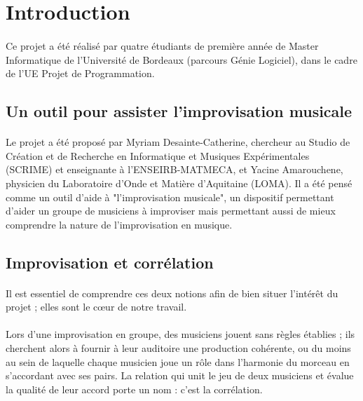 
\section{Introduction}
\paragraph{}
Ce projet a été réalisé par quatre étudiants de première année de
Master Informatique de l'Université de Bordeaux (parcours Génie
Logiciel), dans le cadre de l'UE Projet de Programmation.

\subsection{Un outil pour assister l'improvisation musicale}
\paragraph{}
Le projet a été proposé par Myriam Desainte-Catherine, chercheur au
Studio de Création et de Recherche en Informatique et Musiques
Expérimentales (SCRIME) et enseignante à l'ENSEIRB-MATMECA, et Yacine
Amarouchene, physicien du Laboratoire d'Onde et Matière d'Aquitaine
(LOMA). Il a été pensé comme un outil d'aide à "l'improvisation
musicale", un dispositif permettant d'aider un groupe de musiciens à
improviser mais permettant aussi de mieux comprendre la nature de
l'improvisation en musique.

\subsection{Improvisation et corrélation}
\paragraph{}

Il est essentiel de comprendre ces deux notions afin de bien situer
l'intérêt du projet ; elles sont le c\oe ur de notre travail.

\paragraph{}
Lors d'une improvisation en groupe, des musiciens jouent sans règles
établies ; ils cherchent alors à fournir à leur auditoire une
production cohérente, ou du moins au sein de laquelle chaque musicien
joue un rôle dans l'harmonie du morceau en s'accordant avec ses
pairs. La relation qui unit le jeu de deux musiciens et évalue la
qualité de leur accord porte un nom : c'est la corrélation.

